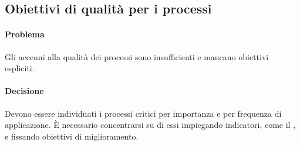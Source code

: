 \subsection{Obiettivi di qualità per i processi}
\paragraph{Problema} Gli accenni alla qualità dei processi sono insufficienti e mancano obiettivi espliciti.
\paragraph{Decisione} Devono essere individuati i processi critici per importanza e per frequenza di applicazione. È necessario concentrarsi su di essi impiegando indicatori, come il , e fissando obiettivi di miglioramento.
